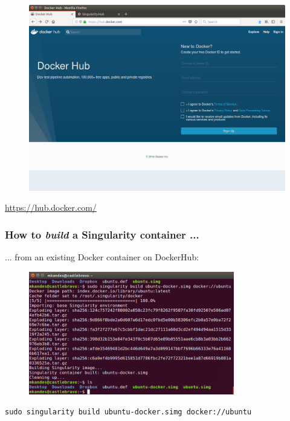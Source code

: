 \documentclass{beamer}
\begin{document}
\begin{frame}
   \frametitle{}
   \begin{figure}[htbp]
      \includegraphics[width=1.0\textwidth]{images/docker-hub-homepage.png}
   \end{figure}
   \begin{center}
      \url{https://hub.docker.com/}
   \end{center}
\end{frame}

\begin{frame}
   \frametitle{How to \textit{build} a Singularity container ...}
   ... from an existing Docker container on DockerHub:
   \begin{figure}[htbp]
      \includegraphics[width=0.8\textwidth]{images/singularity-build-docker.png}
   \end{figure}
   \lstinline{sudo singularity build ubuntu-docker.simg docker://ubuntu}
\end{frame}
\end{document}
